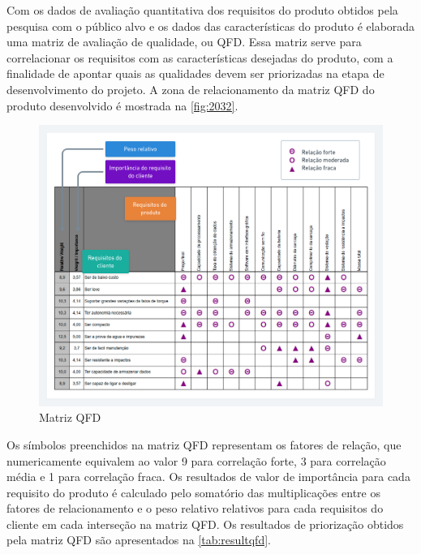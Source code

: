 Com os dados de avaliação quantitativa dos requisitos do produto obtidos pela pesquisa com o público alvo e os dados das características do produto é elaborada uma matriz de  avaliação de qualidade, ou QFD.
Essa matriz serve para correlacionar os requisitos com as características desejadas do produto, com a finalidade de apontar quais as qualidades devem ser priorizadas na etapa de desenvolvimento do projeto.
A zona de relacionamento da matriz QFD do produto desenvolvido é mostrada na \autoref{fig:2032}.

\begin{figure}[H]
	\caption{\label{fig:2032} Matriz QFD}
	\begin{center}
		\includegraphics[width=\textwidth]{pictures/2032.png}
	\end{center}
\end{figure}

Os símbolos preenchidos na matriz QFD representam os fatores de relação, que numericamente equivalem ao valor 9 para correlação forte, 3 para correlação média e 1 para correlação fraca.
Os resultados de valor de importância para cada requisito do produto é calculado pelo somatório das multiplicações entre os fatores de relacionamento e o peso relativo relativos para
cada requisitos do cliente em cada interseção na matriz QFD.
Os resultados de priorização obtidos pela matriz QFD são apresentados na \autoref{tab:resultqfd}.

